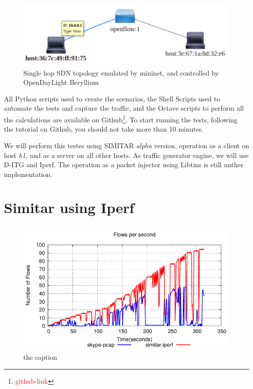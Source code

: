 \begin{figure}[!ht]
	\centering
	\includegraphics[scale=0.4]{figures/ch5/topo-simple}
	\caption{Single hop SDN topology emulated by mininet, and controlled by OpenDayLight Beryllium}
	\label{fig:topo-simple}
\end{figure}

All Python scripts used to create the scenarios, the Shell Scripts used to automate the tests and capture the traffic, and the Octave scripts to perform all the calculations are available on Github\footnote{\textcolor{red}{github-link}}. To start running the tests, following the tutorial on Github, you should not take more than 10 minutes.

We will perform this testes using SIMITAR \textit{alpha} version, operation as a client on host \textit{h1}, and as a server on all other hosts. As traffic generator engine, we will use D-ITG and Iperf. The operation as a packet injector using Libtins is still unther implementation.

\section{Simitar using Iperf}


\begin{figure}[!ht]
	\centering
	\includegraphics[]{figures/ch5/iperfFlowsPs.pdf}
	\caption{the caption}
	\label{fig:iperfFlowsPs}
\end{figure}

